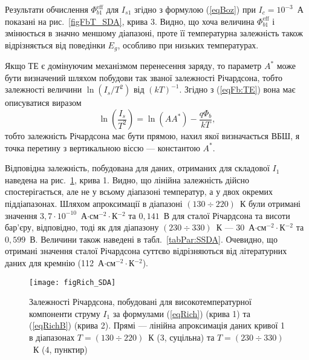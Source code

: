 Результати обчислення $\Phi_{b1}^\mathrm{eff}$ для $I_{s1}$ згідно з формулою (\ref{eqBoz}) при $I_c=10^{-3}$~А показані на рис.~\ref{figFbT_SDA}, крива 3.
Видно, що хоча величина $\Phi_{b1}^\mathrm{eff}$ і змінюється в значно меншому діапазоні,
проте її температурна залежність також відрізняється від поведінки $E_g$, особливо при низьких температурах.


Якщо ТЕ є домінуючим механізмом перенесення заряду, то параметр $A^*$ може бути
визначений \cite{Rhoderick1988,Schroder2006} шляхом побудови так званої залежності Річардсона,
тобто залежності величини $\ln(I_s/T^2)$ від $(kT)^{-1}$.
Згідно з (\ref{eqFb:TE}) вона має описуватися виразом
\begin{equation}\label{eqRich}
\ln\left(\frac{I_s}{T^2}\right)=\ln(AA^*)-\frac{q\Phi_b}{kT},
\end{equation}
тобто залежність Річардсона має бути прямою, нахил якої визначається ВБШ,
я точка перетину з вертикальною віссю --- константою $A^*$.


Відповідна залежність, побудована для даних, отриманих для складової $I_1$ наведена
на рис.~\ref{figRich_SDA}, крива 1.
Видно, що лінійна залежність дійсно спостерігається, але не у всьому діапазоні температур, а у двох окремих піддіапазонах.
Шляхом апроксимації в діапазоні $(130\div220)$~К були отримані значення $3,7\cdot10^{-10}$~А$\cdot$см$^{-2}\cdot$К$^{-2}$ та
$0,141$~В для сталої Річардсона та висоти бар'єру, відповідно,
тоді як для діапазону $(230\div330)$~К ---
$30$~А$\cdot$см$^{-2}\cdot$К$^{-2}$ та $0,599$~В.
Величини також наведені в табл.~\ref{tabPar:SSDA}.
Очевидно, що отримані значення сталої Річардсона суттєво відрізняються від літературних даних
для кремнію (112~А$\cdot$см$^{-2}\cdot$К$^{-2}$).


\begin{figure}
\center
\texttt{[image: figRich\_SDA]}
\caption{\label{figRich_SDA}
Залежності Річардсона, побудовані для високотемпературної компоненти струму $I_1$
за формулами (\ref{eqRich}) (крива 1) та (\ref{eqRichB}) (крива 2).
Прямі --- лінійна апроксимація даних кривої 1 в діапазонах $T=(130\div220)$~К (3, суцільна)
та $T=(230\div330)$~К (4, пунктир)
}%
\end{figure}



